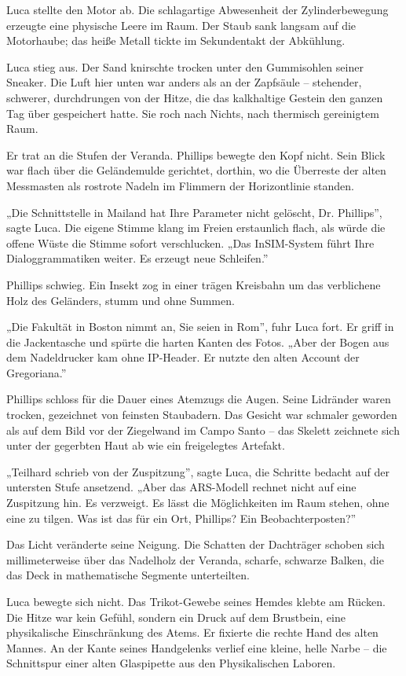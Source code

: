 \documentclass[
  ngerman,
]{article}
\begin{document}
Luca stellte den Motor ab. Die schlagartige Abwesenheit der
Zylinderbewegung erzeugte eine physische Leere im Raum. Der Staub sank
langsam auf die Motorhaube; das heiße Metall tickte im Sekundentakt der
Abkühlung.

Luca stieg aus. Der Sand knirschte trocken unter den Gummisohlen seiner
Sneaker. Die Luft hier unten war anders als an der Zapfsäule --
stehender, schwerer, durchdrungen von der Hitze, die das kalkhaltige
Gestein den ganzen Tag über gespeichert hatte. Sie roch nach Nichts,
nach thermisch gereinigtem Raum.

Er trat an die Stufen der Veranda. Phillips bewegte den Kopf nicht. Sein
Blick war flach über die Geländemulde gerichtet, dorthin, wo die
Überreste der alten Messmasten als rostrote Nadeln im Flimmern der
Horizontlinie standen.

„Die Schnittstelle in Mailand hat Ihre Parameter nicht gelöscht, Dr.
Phillips'', sagte Luca. Die eigene Stimme klang im Freien erstaunlich
flach, als würde die offene Wüste die Stimme sofort verschlucken. „Das
InSIM-System führt Ihre Dialoggrammatiken weiter. Es erzeugt neue
Schleifen.''

Phillips schwieg. Ein Insekt zog in einer trägen Kreisbahn um das
verblichene Holz des Geländers, stumm und ohne Summen.

„Die Fakultät in Boston nimmt an, Sie seien in Rom'', fuhr Luca fort. Er
griff in die Jackentasche und spürte die harten Kanten des Fotos. „Aber
der Bogen aus dem Nadeldrucker kam ohne IP-Header. Er nutzte den alten
Account der Gregoriana.''

Phillips schloss für die Dauer eines Atemzugs die Augen. Seine Lidränder
waren trocken, gezeichnet von feinsten Staubadern. Das Gesicht war
schmaler geworden als auf dem Bild vor der Ziegelwand im Campo Santo --
das Skelett zeichnete sich unter der gegerbten Haut ab wie ein
freigelegtes Artefakt.

„Teilhard schrieb von der Zuspitzung'', sagte Luca, die Schritte bedacht
auf der untersten Stufe ansetzend. „Aber das ARS-Modell rechnet nicht
auf eine Zuspitzung hin. Es verzweigt. Es lässt die Möglichkeiten im
Raum stehen, ohne eine zu tilgen. Was ist das für ein Ort, Phillips? Ein
Beobachterposten?''

Das Licht veränderte seine Neigung. Die Schatten der Dachträger schoben
sich millimeterweise über das Nadelholz der Veranda, scharfe, schwarze
Balken, die das Deck in mathematische Segmente unterteilten.

Luca bewegte sich nicht. Das Trikot-Gewebe seines Hemdes klebte am
Rücken. Die Hitze war kein Gefühl, sondern ein Druck auf dem Brustbein,
eine physikalische Einschränkung des Atems. Er fixierte die rechte Hand
des alten Mannes. An der Kante seines Handgelenks verlief eine kleine,
helle Narbe -- die Schnittspur einer alten Glaspipette aus den
Physikalischen Laboren.
\end{document}
